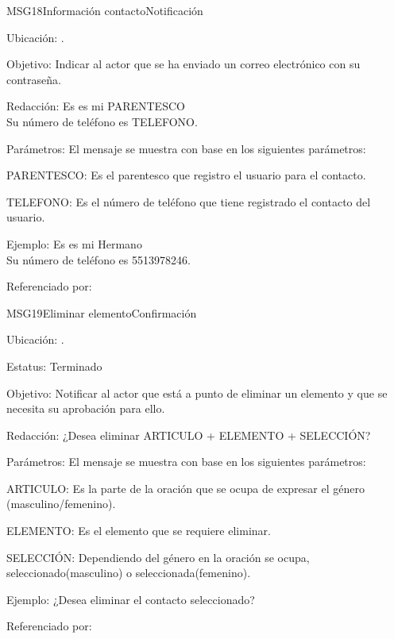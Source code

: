 \begin{mensaje}{MSG18}{Información contacto}{Notificación}
	\item[Ubicación:] \msjEmergente.
	\item[Objetivo:] Indicar al actor que se ha enviado un correo electrónico con su contraseña.
	\item[Redacción:] Es es mi PARENTESCO \\
	Su número de teléfono es TELEFONO.
	\item[Parámetros:] El mensaje se muestra con base en los siguientes parámetros:
	\begin{Citemize}
		\item PARENTESCO: Es el parentesco que registro el usuario para el contacto.
		\item TELEFONO: Es el número de teléfono que tiene registrado el contacto del usuario.
	\end{Citemize}
	\item[Ejemplo:] Es es mi Hermano \\
	Su número de teléfono es 5513978246.
	\item[Referenciado por:] 
\end{mensaje}

\begin{mensaje}{MSG19}{Eliminar elemento}{Confirmación}
	\item[Ubicación:] \msjEmergente.
	\item[Estatus:] Terminado
	\item[Objetivo:] Notificar al actor que está a punto de eliminar un elemento y que se necesita su aprobación para ello.
	\item[Redacción:] ¿Desea eliminar ARTICULO + ELEMENTO + SELECCIÓN?
	\item[Parámetros:] El mensaje se muestra con base en los siguientes parámetros:
	\begin{Citemize} 
		\item ARTICULO: Es la parte de la oración que se ocupa de expresar el género (masculino/femenino).
		\item ELEMENTO: Es el elemento que se requiere eliminar.
		\item SELECCIÓN: Dependiendo del género en la oración se ocupa, seleccionado(masculino) o seleccionada(femenino).
	\end{Citemize}
	\item[Ejemplo:] ¿Desea eliminar el contacto seleccionado?
	\item[Referenciado por:] 
\end{mensaje}

